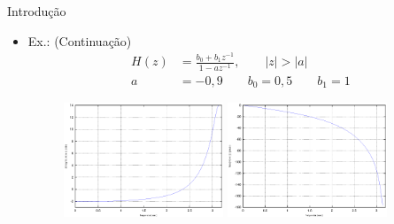 \begin{slide}{Introdu\c c\~ao}
\begin{itemize}
   \item Ex.: (Continuação)
   \begin{align*}
      H(z) &= \frac{b_0 + b_1z^{-1}}{1-az^{-1}}, \qquad |z|>|a| \\
      a &= -0,9\qquad b_0=0,5\qquad b_1=1
   \end{align*}
   \begin{figure}
      \centering
      \includegraphics[width = 0.45\textwidth]{figs/mod1.eps}
      \includegraphics[width = 0.45\textwidth]{figs/fase1.eps}
   \end{figure}
\end{itemize}
\end{slide}

